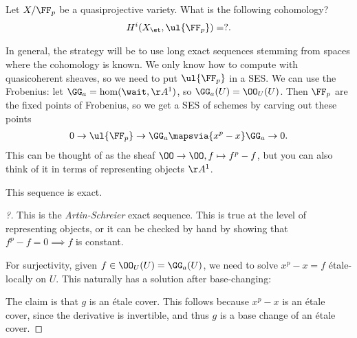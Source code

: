 \begin{example}[?]

Let \(X/\FF_p\) be a quasiprojective variety. What is the following
cohomology?
\begin{align*}  
H^i(X_\et, \ul{\FF_p})  = ?
.\end{align*}

In general, the strategy will be to use long exact sequences stemming
from spaces where the cohomology is known. We only know how to compute
with quasicoherent sheaves, so we need to put \(\ul{\FF_p}\) in a SES.
We can use the Frobenius: let \(\GG_a = \hom(\wait, \AA^1)\), so
\(\GG_a(U) = \OO_U(U)\). Then \(\FF_p\) are the fixed points of
Frobenius, so we get a SES of schemes by carving out these points
\begin{align*}  
0 \to
\ul{\FF_p} \to
\GG_a \mapsvia{x^p - x}
\GG_a \to 
0
.\end{align*} This can be thought of as the sheaf
\(\OO \to \OO, f \mapsto f^p -f\), but you can also think of it in terms
of representing objects \(\AA^1\).

\begin{claim}

This sequence is exact.

\end{claim}

\begin{proof}[?]

This is the \emph{Artin-Schreier} exact sequence. This is true at the
level of representing objects, or it can be checked by hand by showing
that \(f^p - f = 0 \implies f\) is constant.

For surjectivity, given \(f\in \OO_U(U) = \GG_a(U)\), we need to solve
\(x^p - x = f\) étale-locally on \(U\). This naturally has a solution
after base-changing:

\begin{center}
\end{center}

The claim is that \(g\) is an étale cover. This follows because
\(x^p-x\) is an étale cover, since the derivative is invertible, and
thus \(g\) is a base change of an étale cover.

\end{proof}


\end{example}
